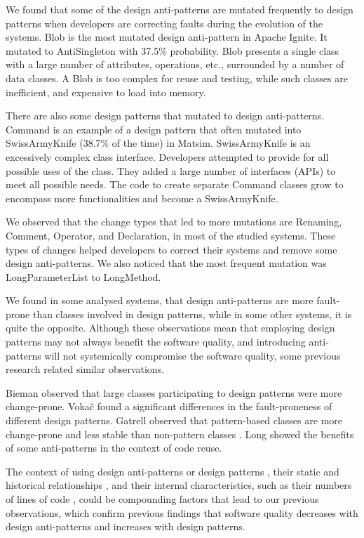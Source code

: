 We found that some of the design anti-patterns are mutated frequently to design patterns when developers are correcting faults during the evolution of the systems. Blob is the most mutated design anti-pattern in Apache Ignite. It mutated to AntiSingleton with 37.5\% probability. Blob presents a single class with a large number of attributes, operations, etc., surrounded by a number of data classes. A Blob is too complex for reuse and testing, while such classes are inefficient, and expensive to load into memory. 

There are also some design patterns that mutated to design anti-patterns. Command is an example of a design pattern that often mutated into SwissArmyKnife (38.7\% of the time) in Matsim. SwissArmyKnife is an excessively complex class interface. Developers attempted to provide for all possible uses of the class. They added a large number of interfaces (APIs) to meet all possible needs. The code to create separate Command classes grow to encompass more functionalities and become a SwissArmyKnife.

We observed that the change types that led to more mutations are Renaming, Comment, Operator, and Declaration, in most of the studied systems. These types of changes helped developers to correct their systems and remove some design anti-patterns. We also noticed that the most frequent mutation was LongParameterList to LongMethod.

We found in some analysed systems, that design anti-patterns are more fault-prone than classes involved in design patterns, while in some other systems, it is quite the opposite. Although these observations mean that employing design patterns may not always benefit the software quality, and introducing anti-patterns will not systemically compromise the software quality, some previous research related similar observations.

Bieman \etal{} \cite{bieman2003design} observed that large classes participating to design patterns were more change-prone. Voka\v{c} \etal{} \cite{vokavc2004defect} found a significant differences in the fault-proneness of different design patterns. Gatrell \etal{} \cite{gatrell2009design} observed that pattern-based classes are more change-prone and less stable than non-pattern classes \cite{vokavc2004defect}. Long \cite{long2001software} showed the benefits of some anti-patterns in the context of code reuse.

The context of using design anti-patterns or design patterns \cite{long2001software}, their static and historical relationships \cite{jaafar2013analysing,jaafar2013mining}, and their internal characteristics, such as their numbers of lines of code  \cite{bieman2003design}, could be compounding factors that lead to our previous observations, which confirm previous findings that software quality decreases with design anti-patterns and increases with design patterns.

